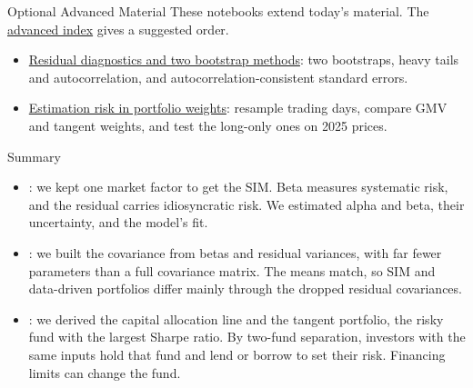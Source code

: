 \documentclass[aspectratio=169,11pt]{beamer}
\newcommand{\repo}{https://github.com/varnerlab/CHEME-5660-CourseRepository-Fall-2026/blob/main/lectures/week-6/L6b}
\begin{document}
\begin{frame}{Optional Advanced Material}
  These notebooks extend today's material. The
  \href{\repo/advanced/README.md}{advanced index} gives a suggested order.

  \vspace{0.4em}
  \begin{itemize}\setlength{\itemsep}{0.45em}
    \item \href{\repo/advanced/diagnostics/CHEME-5660-L6b-Advanced-SIM-Diagnostics-Fall-2026.ipynb}{Residual diagnostics and two bootstrap methods}:
      two bootstraps, heavy tails and autocorrelation, and
      autocorrelation-consistent standard errors.
    \item \href{\repo/advanced/estimation-risk/CHEME-5660-L6b-Advanced-EstimationRisk-Fall-2026.ipynb}{Estimation risk in portfolio weights}:
      resample trading days, compare GMV and tangent weights, and test the
      long-only ones on 2025 prices.
  \end{itemize}
\end{frame}

\begin{frame}{Summary}
  \begin{itemize}\setlength{\itemsep}{0.8em}
    \item {}: we kept one market
      factor to get the SIM. Beta measures systematic risk, and the residual
      carries idiosyncratic risk. We estimated alpha and beta, their
      uncertainty, and the model's fit.
    \item {}: we built the covariance
      from betas and residual variances, with far fewer parameters than a full
      covariance matrix. The means match, so SIM and data-driven portfolios
      differ mainly through the dropped residual covariances.
    \item {}: we derived the
      capital allocation line and the tangent portfolio, the risky fund with the
      largest Sharpe ratio. By two-fund separation, investors with the same
      inputs hold that fund and lend or borrow to set their risk. Financing
      limits can change the fund.
  \end{itemize}
\end{frame}

\end{document}
